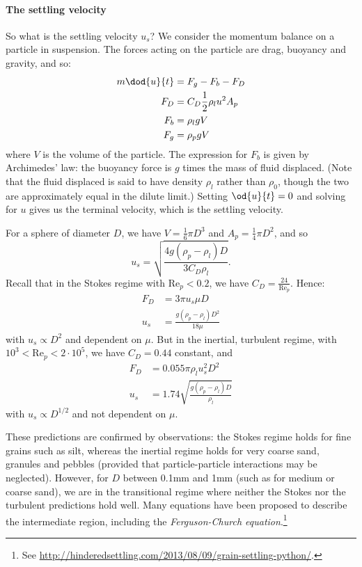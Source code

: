 \paragraph{The settling velocity} So what is the settling velocity $u_s$? We consider the momentum balance on a particle in suspension. The forces acting on the particle are drag, buoyancy and gravity, and so:
\begin{align}
    m\dod{u}{t} &= F_g - F_b - F_D \\
    F_D            &= C_D\frac{1}{2}\rho_lu^2A_p \\
    F_b            &= \rho_lgV \\
    F_g            &= \rho_pgV
\end{align}
where $V$ is the volume of the particle. The expression for $F_b$ is given by Archimedes' law: the buoyancy force is $g$ times the mass of fluid displaced. (Note that the fluid displaced is said to have density $\rho_l$ rather than $\rho_0$, though the two are approximately equal in the dilute limit.) Setting $\od{u}{t} = 0$ and solving for $u$ gives us the terminal velocity, which is the settling velocity.

For a sphere of diameter $D$, we have $V = \frac{1}{6}\pi D^3$ and $A_p = \frac{1}{4}\pi D^2$, and so
\begin{equation}
    u_s=\sqrt{\frac{4g(\rho_p-\rho_l)D}{3C_D\rho_l}}.
\end{equation}
Recall that in the Stokes regime with $\mathrm{Re}_p < 0.2$, we have $C_D=\frac{24}{\mathrm{Re}_p}$. Hence:
\begin{align}
    F_D &= 3\pi u_s \mu D \\
    u_s &= \frac{g(\rho_p-\rho_l)D^2}{18\mu}
\end{align}
with $u_s \propto D^2$ and dependent on $\mu$. But in the inertial, turbulent regime, with $10^3 < \mathrm{Re}_p < 2\cdot10^5$, we have $C_D=0.44$ constant, and 
\begin{align}
    F_D &= 0.055\pi\rho_lu_s^2D^2 \\
    u_s &= 1.74\sqrt{\frac{g(\rho_p-\rho_l)D}{\rho_l}}
\end{align}
with $u_s \propto D^{1/2}$ and not dependent on $\mu$.

These predictions are confirmed by observations: the Stokes regime holds for fine grains such as silt, whereas the inertial regime holds for very coarse sand, granules and pebbles (provided that particle-particle interactions may be neglected). However, for $D$ between 0.1mm and 1mm (such as for medium or coarse sand), we are in the transitional regime where neither the Stokes nor the turbulent predictions hold well. Many equations have been proposed to describe the intermediate region, including the \textit{Ferguson-Church equation}.\footnote{See \url{http://hinderedsettling.com/2013/08/09/grain-settling-python/}.}

